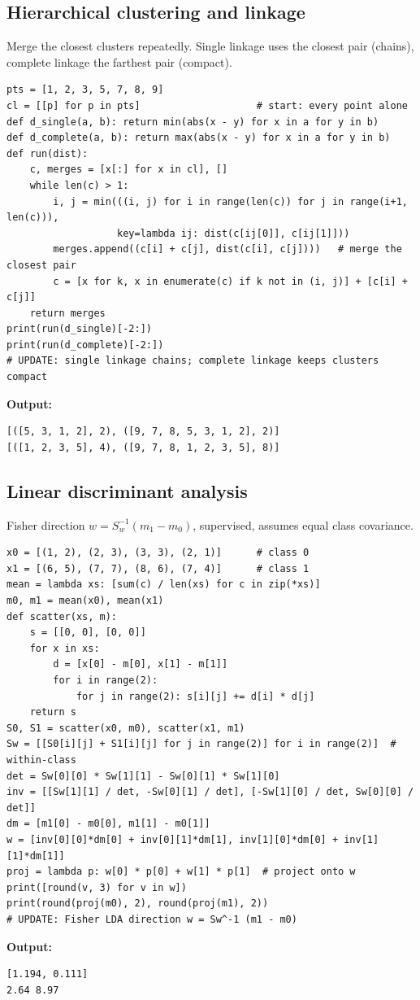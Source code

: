 \documentclass[11pt]{article}
\begin{document}
\subsection*{Hierarchical clustering and linkage}
Merge the closest clusters repeatedly. Single linkage uses the closest pair (chains), complete linkage the farthest pair (compact).
\begin{Verbatim}[fontsize=\footnotesize,frame=single]
pts = [1, 2, 3, 5, 7, 8, 9]
cl = [[p] for p in pts]                    # start: every point alone
def d_single(a, b): return min(abs(x - y) for x in a for y in b)
def d_complete(a, b): return max(abs(x - y) for x in a for y in b)
def run(dist):
    c, merges = [x[:] for x in cl], []
    while len(c) > 1:
        i, j = min(((i, j) for i in range(len(c)) for j in range(i+1, len(c))),
                   key=lambda ij: dist(c[ij[0]], c[ij[1]]))
        merges.append((c[i] + c[j], dist(c[i], c[j])))   # merge the closest pair
        c = [x for k, x in enumerate(c) if k not in (i, j)] + [c[i] + c[j]]
    return merges
print(run(d_single)[-2:])
print(run(d_complete)[-2:])
# UPDATE: single linkage chains; complete linkage keeps clusters compact
\end{Verbatim}
\textbf{Output:}
\begin{Verbatim}[fontsize=\footnotesize,frame=single]
[([5, 3, 1, 2], 2), ([9, 7, 8, 5, 3, 1, 2], 2)]
[([1, 2, 3, 5], 4), ([9, 7, 8, 1, 2, 3, 5], 8)]
\end{Verbatim}
\subsection*{Linear discriminant analysis}
Fisher direction $w=S_w^{-1}(m_1-m_0)$, supervised, assumes equal class covariance.
\begin{Verbatim}[fontsize=\footnotesize,frame=single]
x0 = [(1, 2), (2, 3), (3, 3), (2, 1)]      # class 0
x1 = [(6, 5), (7, 7), (8, 6), (7, 4)]      # class 1
mean = lambda xs: [sum(c) / len(xs) for c in zip(*xs)]
m0, m1 = mean(x0), mean(x1)
def scatter(xs, m):
    s = [[0, 0], [0, 0]]
    for x in xs:
        d = [x[0] - m[0], x[1] - m[1]]
        for i in range(2):
            for j in range(2): s[i][j] += d[i] * d[j]
    return s
S0, S1 = scatter(x0, m0), scatter(x1, m1)
Sw = [[S0[i][j] + S1[i][j] for j in range(2)] for i in range(2)]  # within-class
det = Sw[0][0] * Sw[1][1] - Sw[0][1] * Sw[1][0]
inv = [[Sw[1][1] / det, -Sw[0][1] / det], [-Sw[1][0] / det, Sw[0][0] / det]]
dm = [m1[0] - m0[0], m1[1] - m0[1]]
w = [inv[0][0]*dm[0] + inv[0][1]*dm[1], inv[1][0]*dm[0] + inv[1][1]*dm[1]]
proj = lambda p: w[0] * p[0] + w[1] * p[1]  # project onto w
print([round(v, 3) for v in w])
print(round(proj(m0), 2), round(proj(m1), 2))
# UPDATE: Fisher LDA direction w = Sw^-1 (m1 - m0)
\end{Verbatim}
\textbf{Output:}
\begin{Verbatim}[fontsize=\footnotesize,frame=single]
[1.194, 0.111]
2.64 8.97
\end{Verbatim}
\end{document}
